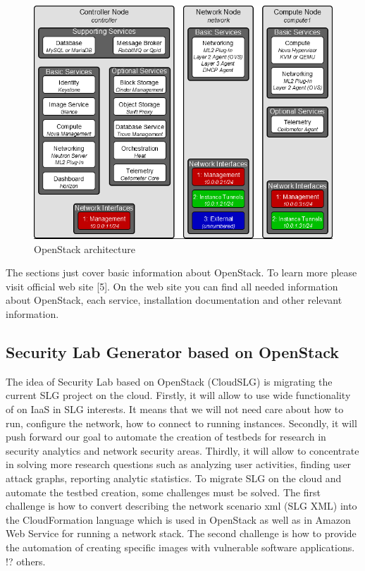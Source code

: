 \begin{figure}[ht!]
\centering
\includegraphics[width=\textwidth]{openstack_architecture.png}
\caption{OpenStack architecture}
\label{overflow}
\end{figure}

The sections just cover basic information about OpenStack. To learn more please visit official web site [5]. On the web site you can find all needed information about OpenStack, each service, installation documentation and other relevant information. 


\subsection{Security Lab Generator based on OpenStack}
The idea of Security Lab based on OpenStack (CloudSLG) is migrating the current SLG project on the cloud. Firstly, it will allow to use wide functionality of on IaaS in SLG interests. It means that we will not need care about how to run, configure the network, how to connect to running instances. Secondly, it will push forward our goal to automate the creation of testbeds for research in security analytics and network security areas. Thirdly, it will allow to concentrate in solving more research questions such as analyzing user activities, finding user attack graphs, reporting analytic statistics. To migrate SLG on the cloud and automate the testbed creation, some challenges must be solved. The first challenge is how to convert describing the network scenario xml (SLG XML) into the CloudFormation language which is used in OpenStack as well as in Amazon Web Service for running a network stack. The second challenge is how to provide the automation of creating specific images with vulnerable software applications. !? others.  



% 